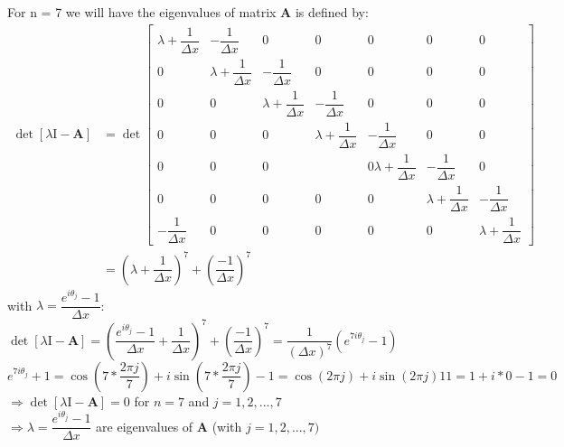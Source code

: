 \documentclass[14pt,a4paper]{article}
\begin{document}
\begin{enumerate}
	For n = 7 we will have the eigenvalues of matrix \textbf{A} is defined by:
	\begin{align*}\det[\lambda\mathrm{I} - \textbf{A}] &= \det \begin{bmatrix} \lambda +\dfrac{1}{\Delta x}&-\dfrac{1}{\Delta x}&0&0 & 0&0 &0 \\ 0&\lambda+\dfrac{1}{\Delta x}&-\dfrac{1}{\Delta x}&0& 0&0 &0 \\ 0&0& \lambda +\dfrac{1}{\Delta x}&-\dfrac{1}{\Delta x} &0&0&0 \\ 0&0&0& \lambda +\dfrac{1}{\Delta x}&-\dfrac{1}{\Delta x} &0&0 \\ 0&0&0&&0 \lambda +\dfrac{1}{\Delta x}&-\dfrac{1}{\Delta x} &0 \\0&0&0&0&0&\lambda+\dfrac{1}{\Delta x}&-\dfrac{1}{\Delta x} \\ -\dfrac{1}{\Delta x}& 0&0&0 &0 &0 &\lambda +\dfrac{1}{\Delta x}\end{bmatrix} \\
	&= \left(\lambda+\dfrac{1}{\Delta x}\right)^7 + \left(\dfrac{-1}{\Delta x} \right)^7 \end{align*} 
	with $\lambda = \dfrac{e^{i\theta_j}-1}{\Delta x}$: $ \det[\lambda\mathrm{I} - \textbf{A}] = \left(\dfrac{e^{i\theta_j}-1}{\Delta x}+\dfrac{1}{\Delta x}\right)^7 + \left(\dfrac{-1}{\Delta x} \right)^7 = \dfrac{1}{(\Delta x)^7}(e^{7i\theta_j} - 1)$\\
	$e^{7i\theta_j} + 1 = \cos\left(7*\dfrac{2\pi j}{7}\right) + i\sin\left(7*\dfrac{2\pi j}{7}\right) - 1 = \cos(2\pi j) + i\sin(2\pi j) 1 1 = 1 + i*0 - 1 = 0$\\
	$\Rightarrow \det[\lambda\mathrm{I} - \textbf{A}] = 0$ for $n = 7$ and $j = 1,2,...,7$\\
	$\Rightarrow \lambda = \dfrac{e^{i\theta_j}-1}{\Delta x}$ are eigenvalues of \textbf{A} (with $j = 1,2,...,7)$\\
	

\end{enumerate}
\end{document}
